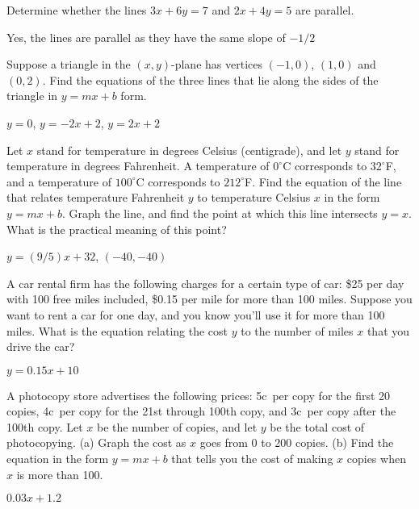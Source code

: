 \begin{enumialphparenastyle}
\begin{ex}
Determine whether the lines $3x+6y=7$ and $2x+4y=5$ are parallel.
\begin{sol}
Yes, the lines are parallel as they have the same slope of $-1/2$
\end{sol}
\end{ex}

\begin{ex}
Suppose a triangle in the $(x,y)$-plane has vertices $(-1,0)$,
$(1,0)$ and $(0,2)$.  Find the equations of the three lines that lie along
 the sides of the triangle in $y=mx+b$ form.
\begin{sol}
$y=0$, $y=-2x+2$, $y=2x+2$
\end{sol}
\end{ex}

\begin{ex}
Let $x$ stand for temperature in degrees Celsius (centigrade), and let
$y$ stand for temperature in degrees Fahrenheit.  A temperature of $0^\circ$C
corresponds to $32^\circ$F, and a temperature of
$100^\circ$C corresponds to $212^\circ$F.  Find the
equation of the line that relates temperature Fahrenheit $y$ to
temperature Celsius $x$ in the form $y=mx+b$.  
Graph the line, and find the point at which this line intersects $y=x$.
What is the practical meaning of this point?
\begin{sol}
$y=(9/5)x+32$, $(-40,-40)$
\end{sol}
\end{ex}

\begin{ex}
A car rental firm has the following charges for a certain type of car:
\$25 per day with 100 free miles included, \$0.15 per mile for more than
100 miles.  Suppose you want to rent a car for one day, and you know you'll
use it for more than 100 miles.  What is the equation relating the cost
$y$ to the number of miles $x$ that you drive the car?
\begin{sol}
$y=0.15x+10$
\end{sol}
\end{ex}

\begin{ex}
A photocopy store advertises the following prices: 5c~per
copy for the first 20 copies, 4c~per copy for the 21st through
100th copy, and 3c~per copy after the 100th copy.  Let $x$ be the
number of copies, and let $y$ be the total cost of photocopying.  (a)
Graph the cost as $x$ goes from 0 to 200 copies.  (b) Find the
equation in the form $y=mx+b$ that tells you the cost of making $x$
copies when $x$ is more than 100.
\begin{sol}
$0.03x+1.2$
\end{sol}
\end{ex}


\end{enumialphparenastyle}

